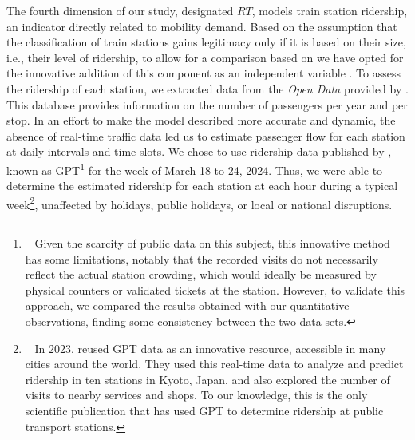 \begin{refsegment}
The fourth dimension of our study, designated \(RT\), models train station ridership, an indicator directly related to mobility demand. Based on the assumption that the classification of train stations gains legitimacy only if it is based on their size, i.e., their level of ridership, to allow for a comparison based on  we have opted for the innovative addition of this component as an independent variable \textcolor{blue}{\autocite[194]{reusser_classifying_2008}}. To assess the ridership of each station, we extracted data from the \textsl{Open Data} provided by \textcolor{blue}{\textcite{sncf_frequentation_2024}}. This database provides information on the number of passengers per year and per stop. In an effort to make the model described more accurate and dynamic, the absence of real-time traffic data led us to estimate passenger flow for each station at daily intervals and time slots. We chose to use ridership data published by \textcolor{blue}{\textcite{google_maps_google_2024}}, known as \acrfull{GPT}\footnote{~
    Given the scarcity of public data on this subject, this innovative method has some limitations, notably that the recorded visits do not necessarily reflect the actual station crowding, which would ideally be measured by physical counters or validated tickets at the station. However, to validate this approach, we compared the results obtained with our quantitative observations, finding some consistency between the two data sets.
} for the week of March 18 to 24, 2024. Thus, we were able to determine the estimated ridership for each station at each hour during a typical week\footnote{~
    In 2023, \textcolor{blue}{\textcite[5]{vongvanich_explaining_2023}} reused \acrshort{GPT} data as an innovative resource, accessible in many cities around the world. They used this real-time data to analyze and predict ridership in ten stations in Kyoto, Japan, and also explored the number of visits to nearby services and shops. To our knowledge, this is the only scientific publication that has used \acrshort{GPT} to determine ridership at public transport stations.
}, unaffected by holidays, public holidays, or local or national disruptions.


\end{refsegment}
